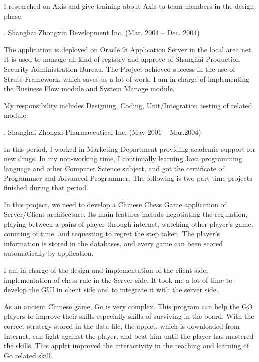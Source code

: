 I researched on Axis and give training about Axis to team members in the design phase. 

. Shanghai Zhongxin Development Inc. (Mar. 2004 -- Dec. 2004)\par

\noindent
The application is deployed on Oracle 9i Application Server in the local area net. 
It is used to manage all kind of  registry and approve of Shanghai Production 
Security Administration Bureau. The Project achieved success in the use of Struts 
Framework, which saves us a lot of work. I am in charge of implementing the 
Business Flow module and System Manage module. 

My responsibility includes Designing, Coding, Unit/Integration testing of related module. 

. Shanghai Zhongxi Pharmaceutical Inc. (May 2001 -- Mar.2004)\par

\noindent
In this period, I worked in Marketing Department providing academic support for new drugs. 
In my non-working time, I continually learning Java programming language 
and other Computer Science subject, and got the certificate of Programmer 
and Advanced Programmer. The following is two part-time projects finished during that period.


In this project, we need to develop a Chinese Chess Game application 
of Server/Client architecture. Its main features include negotiating 
the regulation, playing between a pairs of player through internet, 
watching other player's game, counting of time, and requesting to regret
 the step taken. The player's information is stored in the databases,
  and every game can been scored automatically by application. 

I am in charge of the design and implementation of the client side, 
implementation of chess rule in the Server side. It took me a lot of 
time to develop the GUI in client side and to integrate it with the
 server side. 


As an ancient Chinese game, Go is very complex. This program can help the
GO players to improve their skills especially skills of surviving 
in the board. With
the correct strategy stored in the data file, the applet, which is
 downloaded from Internet, can fight against the player, and beat him 
 until the player has mastered the skills. This applet improved the 
 interactivity in the teaching and learning of Go related skill. 

